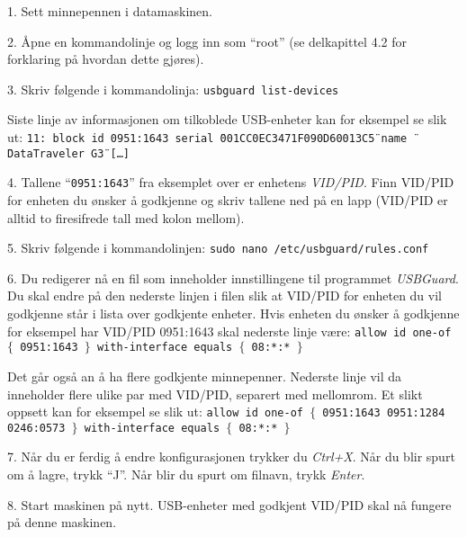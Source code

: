 \item{1.} Sett minnepennen i datamaskinen.
\item{2.} \AA pne en kommandolinje og logg inn som ``root'' (se delkapittel 4.2 for forklaring p\aa{} hvordan dette gj\o res).
\item{3.} Skriv f\o lgende i kommandolinja:
\medskip
{\tt usbguard list-devices}
\medskip
\item{} Siste linje av informasjonen om tilkoblede USB-enheter kan for eksempel se slik ut:
\medskip
{\tt 11: block id 0951:1643 serial \"{}001CC0EC3471F090D60013C5\"{} name \"{}DataTraveler G3\"{} [\dots]}
\medskip
\item{4.} Tallene ``{\tt 0951:1643}'' fra eksemplet over er enhetens {\it VID/PID}. Finn VID/PID for enheten du \o nsker \aa{} godkjenne og skriv tallene ned p\aa{} en lapp (VID/PID er alltid to firesifrede tall med kolon mellom).
\item{5.} Skriv f\o lgende i kommandolinjen:
\medskip
{\tt sudo nano /etc/usbguard/rules.conf}
\medskip
\item{6.} Du redigerer n\aa{} en fil som inneholder innstillingene til programmet {\it USBGuard}. Du skal endre p\aa{} den nederste linjen i filen slik at VID/PID for enheten du vil godkjenne st\aa r i lista over godkjente enheter. Hvis enheten du \o nsker \aa{} godkjenne for eksempel har VID/PID 0951:1643 skal nederste linje v\ae re:
\medskip
{\tt allow id one-of $\{$ 0951:1643 $\}$ with-interface equals $\{$ 08:*:* $\}$ }
\medskip
\item{} Det g\aa r ogs\aa{} an \aa{} ha flere godkjente minnepenner. Nederste linje vil da inneholder flere ulike par med VID/PID, separert med mellomrom. Et slikt oppsett kan for eksempel se slik ut:
\medskip
{\tt allow id one-of $\{$ 0951:1643 0951:1284 0246:0573 $\}$ with-interface equals $\{$ 08:*:* $\}$ }
\medskip
\item{7.} N\aa r du er ferdig \aa{} endre konfigurasjonen trykker du {\it Ctrl+X}. N\aa r du blir spurt om \aa{} lagre, trykk ``J''. N\aa r blir du spurt om filnavn, trykk {\it Enter}.

\item{8.} Start maskinen p\aa{} nytt. USB-enheter med godkjent VID/PID skal n\aa{} fungere p\aa{} denne maskinen.

\vfill\eject


